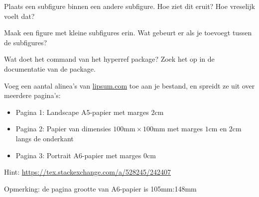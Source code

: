 \documentclass[a4paper]{article}
\begin{document}
    \begin{exercise}
        Plaats een subfigure binnen een andere subfigure. Hoe ziet dit eruit?
        Hoe vreselijk voelt dat?
    \end{exercise}

    \begin{exercise}
        Maak een figure met kleine subfigures erin. Wat gebeurt er als je
        \texttt{\hfill} toevoegt tussen de subfigures?
    \end{exercise}

    \begin{exercise}
        Wat doet het command \texttt{\texorpdfstring{}{}} van het hyperref package?
        Zoek het op in de documentatie van de package.
    \end{exercise}

    \begin{exercise}[pageref]
        
    \end{exercise}

    \begin{exercise}
        Voeg een aantal alinea's van \href{https://lipsum.com}{lipsum.com} toe aan je bestand, en spreidt
        ze uit over meerdere pagina's:
        \begin{itemize}
            \item Pagina 1: Landscape A5-papier met marges $ 2\text{cm} $
            \item Pagina 2: Papier van dimensies $ 100\text{mm}\times 100\text{mm} $
            met marges $ 1\text{cm} $ en $ 2\text{cm} $ langs de onderkant
            \item Pagina 3: Portrait A6-papier met marges $ 0\text{cm} $
        \end{itemize}

        Hint: \url{https://tex.stackexchange.com/a/528245/242407}

        Opmerking: de pagina grootte van A6-papier is 105mm:148mm
    \end{exercise}
\end{document}
